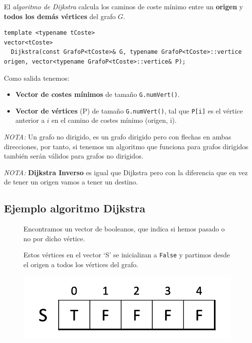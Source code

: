 El \textit{algoritmo de Dijkstra} calcula los caminos de coste mínimo entre un \textbf{origen} y \textbf{todos los demás vértices} del grafo \(G\).

\begin{verbatim}
template <typename tCoste>
vector<tCoste>
  Dijkstra(const GrafoP<tCoste>& G, typename GrafoP<tCoste>::vertice origen, vector<typename GrafoP<tCoste>::vertice& P);
\end{verbatim}

Como salida tenemos:
\begin{itemize}
  \item \textbf{Vector de costes mínimos} de tamaño \verb|G.numVert()|.
  \item \textbf{Vector de vértices} (P) de tamaño \verb|G.numVert()|, tal que \verb|P[i]| es el vértice anterior a \(i\) en el camino de costes mínimo (origen, i).
\end{itemize}

\textit{NOTA:} Un grafo no dirigido, es un grafo dirigido pero con flechas en ambas direcciones, por tanto, si tenemos un algoritmo que funciona para grafos dirigidos también serán válidos para grafos no dirigidos.

\textit{NOTA:} \textbf{Dijkstra Inverso} es igual que Dijkstra pero con la diferencia que en vez de tener un origen vamos a tener un destino.

\subsection{Ejemplo algoritmo Dijkstra}
\begin{figure}[h]
  \begin{minipage}{0.5\textwidth}
    Encontramos un vector de booleanos, que indica si hemos pasado o no por dicho vértice.
  
    Estos vértices en el vector `S' se inicializan a \texttt{False} y partimos desde el origen a todos los vértices del grafo.
  \end{minipage}
  \hfill
  \begin{minipage}{0.4\textwidth}
   \includegraphics[width=\textwidth]{assets/dij2.png} 
  \end{minipage}
\end{figure}

